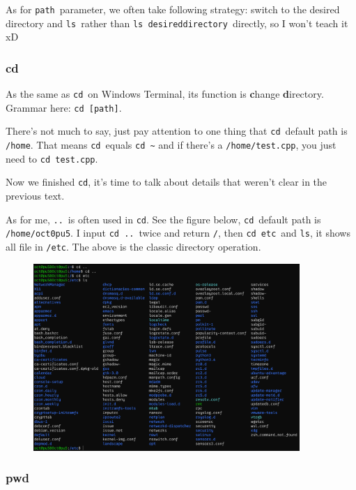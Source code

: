 \documentclass[12pt]{ctexart}
\begin{document}
As for \texttt{path}\ parameter, we often take following strategy: switch
to the desired directory and \texttt{ls}\ rather than
\texttt{ls\ desireddirectory}\ directly, so I won't teach
it xD

\subsubsection*{\textbf{cd}}

As the same as \texttt{cd}\ on Windows Terminal, its function is
\textbf{c}hange \textbf{d}irectory. Grammar here:
\texttt{cd\ {[}path{]}}.

There's not much to say, just pay attention to one thing
that \texttt{cd}\ default path is \texttt{/home}. That means \texttt{cd}\
equals \texttt{cd\ \textasciitilde{}} and if there's a
\texttt{/home/test.cpp}, you just need to \texttt{cd\ test.cpp}.

Now we finished \texttt{cd}, it's time to talk about
details that weren't clear in the previous text.

As for me, \texttt{..}\ is often used in \texttt{cd}. See the figure
below, \texttt{cd}\ default path is \texttt{/home/oct0pu5}. I input
\texttt{cd\ ..}\ twice and return \texttt{/}, then \texttt{cd\ etc}\ and
\texttt{ls}, it shows all file in \texttt{/etc}. The above is the
classic directory operation.

\begin{figure}[H]
    \centering
    \includegraphics[width=0.9\textwidth,keepaspectratio]{assets/Linux/1.4 Linux directory structure and command/4.png}
\end{figure}

\subsubsection*{\textbf{pwd}}
\end{document}
